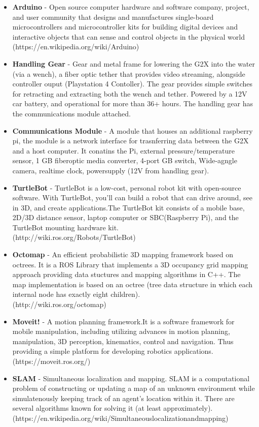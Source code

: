 \documentclass[12pt]{article}
\begin{document}
\begin{itemize}
				\item \textbf{Arduino} - Open source computer hardware and software company, project, and user community that designs and manufactures 		single-board microcontrollers and microcontroller kits for building digital devices and interactive objects that can sense and control objects in the physical world\\ (https://en.wikipedia.org/wiki/Arduino)		
				\item \textbf{Handling Gear} - Gear and metal frame for lowering the G2X into the water (via a wench), a fiber optic tether that provides video streaming, alongside controller ouput (Playstation 4 Contoller). The gear provides simple switches for retracting and extracting both the wench and tether. Powered by a 12V car battery, and operational for more than 36+ hours. The handling gear has the communications module attached.
				\item \textbf{Communications Module} - A module that houses an additional raspberry pi, the module is a network interface for trasnferring data between the G2X and a host computer. It conatins the Pi, external pressure/temperature sensor, 1 GB fiberoptic media converter, 4-port GB switch, Wide-agngle camera, realtime clock, powersupply (12V from handling gear).
				\item \textbf{TurtleBot} - TurtleBot is a low-cost, personal robot kit with open-source software. With TurtleBot, you’ll can build a robot that can drive around, see in 3D, and create applications.The TurtleBot kit consists of a mobile base, 2D/3D distance sensor, laptop computer or SBC(Raspberry Pi), and the TurtleBot mounting hardware kit.\\
				(http://wiki.ros.org/Robots/TurtleBot)
				\item \textbf{Octomap} - An efficient probabilistic 3D mapping framework based on octrees. It is a ROS Library that implements a 3D occupancy grid mapping approach providing data stuctures and mapping algorithms in C++. The map implementation is based on an octree (tree data structure in which each internal node has exactly eight children). \\
				(http://wiki.ros.org/octomap)
				\item \textbf{Moveit!} - A motion planning framework.It is a software framework for mobile manipulation, including utilizing advances in motion planning, manipulation, 3D perception, kinematics, control and navigation. Thus providing a simple platform for developing robotics applications.\\
				(https://moveit.ros.org/)
				\item \textbf{SLAM} - Simultaneous localization and mapping. SLAM is a computational problem of constructing or updating a map of an unknown environment while simulatenously keeping track of an agent's location within it. There are several algorithms known for solving it (at least approximately).\\
				(https://en.wikipedia.org/wiki/Simultaneous\textunderscore localization\textunderscore and\textunderscore mapping)
			\end{itemize}
		
\end{document}
